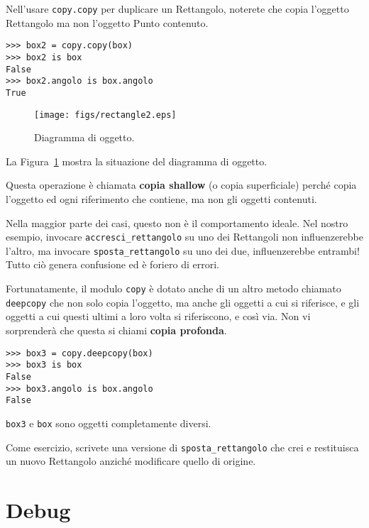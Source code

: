 \documentclass[10pt]{book}
\begin{document}
Nell'usare {\tt copy.copy} per duplicare un Rettangolo, noterete che copia l'oggetto Rettangolo ma non l'oggetto Punto contenuto.

\begin{verbatim}
>>> box2 = copy.copy(box)
>>> box2 is box
False
>>> box2.angolo is box.angolo
True
\end{verbatim}

\begin{figure}
\centerline
{\texttt{[image: figs/rectangle2.eps]}}
\caption{Diagramma di oggetto.}
\label{fig.rectangle2}
\end{figure}

La Figura~\ref{fig.rectangle2} mostra la situazione del diagramma di oggetto.

Questa operazione è chiamata {\bf copia shallow} (o copia superficiale) perché copia l'oggetto ed ogni riferimento che contiene, ma non gli oggetti contenuti.

Nella maggior parte dei casi, questo non è il comportamento ideale. Nel nostro esempio, invocare \verb"accresci_rettangolo" su uno dei Rettangoli non influenzerebbe l'altro, ma invocare \verb"sposta_rettangolo" su uno dei due, influenzerebbe entrambi! Tutto ciò genera confusione ed è foriero di errori.

Fortunatamente, il modulo {\tt copy} è dotato anche di un altro metodo chiamato {\tt deepcopy} che non solo copia l'oggetto, ma anche gli oggetti a cui si riferisce, e gli oggetti a cui questi ultimi a loro volta si riferiscono, e così via. Non vi sorprenderà che questa si chiami {\bf copia profonda}.

\begin{verbatim}
>>> box3 = copy.deepcopy(box)
>>> box3 is box
False
>>> box3.angolo is box.angolo
False
\end{verbatim}
%
{\tt box3} e {\tt box} sono oggetti completamente diversi.

Come esercizio, scrivete una versione di \verb"sposta_rettangolo" che crei e restituisca un nuovo Rettangolo anziché modificare quello di origine.



\section{Debug}
\label{hasattr}
\end{document}

